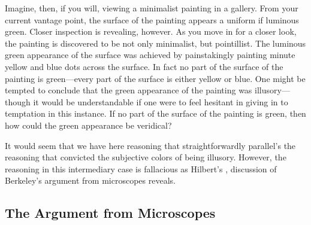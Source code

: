 \documentclass[12pt]{article}
\begin{document}
Imagine, then, if you will, viewing a minimalist painting in a gallery. From your current vantage point, the surface of the painting appears a uniform if luminous green. Closer inspection is revealing, however. As you move in for a closer look, the painting is discovered to be not only minimalist, but pointillist. The luminous green appearance of the surface was achieved by painstakingly painting minute yellow and blue dots across the surface. In fact no part of the surface of the painting is green---every part of the surface is either yellow or blue. One might be tempted to conclude that the green appearance of the painting was illusory---though it would be understandable if one were to feel hesitant in giving in to temptation in this instance. If no part of the surface of the painting is green, then how could the green appearance be veridical? 

It would seem that we have here reasoning that straightforwardly parallel's the reasoning that convicted the subjective colors of being illusory. However, the reasoning in this intermediary case is fallacious as Hilbert's \citeyear[chapter 2]{Hilbert:1987jq}, discussion of Berkeley's \citeyear{Berkeley:1734fk} argument from microscopes reveals.


\subsection{The Argument from Microscopes}\label{sub:the_argument_from_microscopes} %
\end{document}
